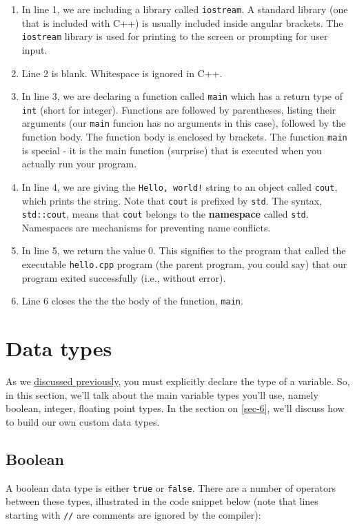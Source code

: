 \documentclass[11pt]{article}
\begin{document}
\begin{enumerate}
\item In line 1, we are including a library called \texttt{iostream}. A standard library (one that is included with C++) is usually included inside angular brackets. The \texttt{iostream} library is used for printing to the screen or prompting for user input.

\item Line 2 is blank. Whitespace is ignored in C++.

\item In line 3, we are declaring a function called \texttt{main} which has a return type of \texttt{int} (short for integer). Functions are followed by parentheses, listing their arguments (our \texttt{main} funcion has no arguments in this case), followed by the function body. The function body is enclosed by brackets. The function \texttt{main} is special - it is the main function (surprise) that is executed when you actually run your program.

\item In line 4, we are giving the \texttt{Hello, world!} string to an object called \texttt{cout}, which prints the string. Note that \texttt{cout} is prefixed by \texttt{std}. The syntax, \texttt{std::cout}, means that \texttt{cout} belongs to the \textbf{namespace} called \texttt{std}. Namespaces are mechanisms for preventing name conflicts.

\item In line 5, we return the value 0. This signifies to the program that called the executable \texttt{hello.cpp} program (the parent program, you could say) that our program exited successfully (i.e., without error).

\item Line 6 closes the the the body of the function, \texttt{main}.
\end{enumerate}

\section{Data types}
\label{sec-3}
As we \hyperref[sec-1-1]{discussed previously}, you must explicitly declare the type of a 
variable. So, in this section, we'll talk about the main variable 
types you'll use, namely boolean, integer, floating point types. In 
the section on \ref{sec-6}, we'll discuss how to build 
our own custom data types.

\subsection{Boolean}
\label{sec-3-1}
A boolean data type is either \texttt{true} or \texttt{false}. There are a number of 
operators between these types, illustrated in the code snippet below 
(note that lines starting with \texttt{//} are comments are ignored by the 
compiler):
\end{document}
